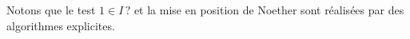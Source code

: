 Notons que le test $1\in I\,?$ et la mise en position de Noether sont 
réalisées par des algorithmes explicites.

\label{subsecGDAC}


